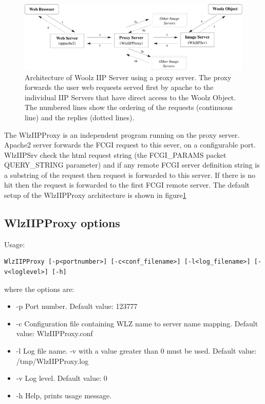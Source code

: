 \documentclass[11pt]{article}
\begin{document}
\begin{figure}[!htb]
\includegraphics[width=\linewidth]{proxyarchit}
\caption{Architecture of Woolz IIP Server using a proxy server.
The proxy forwards the user web requests served first by apache
to the individual IIP Servers that have direct access to the Woolz
Object. The numbered lines show the ordering of the requests (continuous
line) and the replies (dotted lines).}
\label{fig:proxyarchit}
\end{figure}


The WlzIIPProxy is an independent program running on the proxy
server. Apache2 server forwards the FCGI request to this sever,
on a configurable port. WlzIIPSrv check the html request string
(the FCGI\_PARAMS packet QUERY\_STRING parameter) and if any
remote FCGI server definition string is a substring of the
request then request is forwarded to this server. If there is no
hit then the request is forwarded to the first FCGI remote server.
The default setup of the WlzIIPProxy architecture is shown in
figure\ref{fig:proxyarchit}


\subsection{WlzIIPProxy options}
Usage:
\begin{verbatim}
WlzIIPProxy [-p<portnumber>] [-c<conf_filename>] [-l<log_filename>] [-v<loglevel>] [-h]
\end{verbatim}

where the options are:
\begin{itemize}
\item -p  Port number. Default value: 123777
\item -c  Configuration file containing WLZ name to server name mapping.
          Default value: \mbox{WlzIIPProxy.conf}
\item -l  Log file name. -v with a value greater than 0 must be used.
          Default value: \mbox{/tmp/WlzIIPProxy.log}
\item -v  Log level. Default value: 0
\item -h  Help, prints usage message.
\end{itemize}
\end{document}

